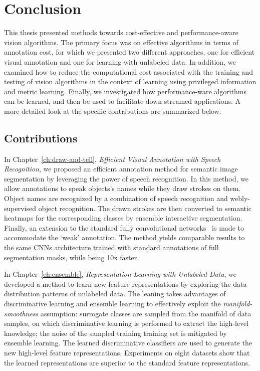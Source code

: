 \chapter{Conclusion} 
\label{ch:conclusion}

This thesis presented methods towards cost-effective and performance-aware vision algorithms.  The primary focus was on  effective algorithms in terms of annotation cost, for which we presented two different approaches, one for efficient visual annotation and one for learning with unlabeled data.  In addition, we examined how to reduce the computational cost associated with the training and testing of vision algorithms in the context of learning using privileged information and metric learning.   Finally, we investigated how  performance-ware algorithms can be learned, and then be used to facilitate down-streamed applications. A more detailed look at the specific contributions are summarized below. 

\section{Contributions} 

In Chapter~\ref{ch:draw-and-tell}, \emph{Efficient Visual Annotation with Speech Recognition}, we proposed an efficient annotation method for semantic image segmentation by leveraging the power of speech recognition. In this method, we allow annotations to speak  objects's names while they draw strokes on them.  Object names are recognized by a combination of speech recognition and webly-supervised object recognition.  The drawn strokes are then converted to semantic heatmaps for the corresponding classes by ensemble interactive segmentation. Finally, an extension to the standard fully convolutional networks~\citep{Long_2015_CVPR} is made to accommodate the `weak' annotation. The method yields comparable results to the same CNNs architecture trained with standard  annotations of full segmentation masks, while being 10x faster. 
 
In Chapter~\ref{ch:ensemble}, \emph{Representation Learning with Unlabeled Data}, we developed a method to learn new feature representations by exploring the data distribution patterns of unlabeled data.  The leaning takes advantages of discriminative learning and ensemble learning to effectively exploit  the \emph{manifold-smoothness} assumption: surrogate classes are sampled from the manifold of data samples, on which discriminative learning is performed to extract the high-level knowledge; the noise of the sampled training training set is mitigated by ensemble learning. The learned discriminative classifiers are used to generate the new high-level feature representations. Experiments on eight datasets show that the learned representations are superior to the standard feature representations. 

